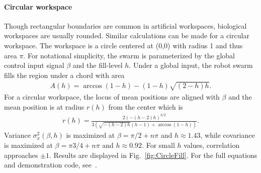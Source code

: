 \paragraph{Circular workspace}
Though rectangular boundaries are common in artificial workspaces, biological workspaces are usually rounded.
Similar calculations can be made for a circular workspace.  The workspace is a circle centered at (0,0) with radius 1 and thus area $\pi$.
For notational simplicity, the swarm is parameterized by the global control input signal $\beta$ and the fill-level $h$.  
Under a global input, the robot swarm fills the region under a chord with area
\begin{align}
A(h) = \arccos(1-h)-(1-h) \sqrt{(2-h) h}.
\end{align}
For a circular workspace, the locus of mean positions are aligned with $\beta$ and the mean position is at radius $r(h)$ from the center which is
\begin{align}
r(h) = \frac{2 (-(h-2) h)^{3/2}}{3 \left(\sqrt{-(h-2) h} (h-1)+\arccos(1-h)\right)}.
\end{align}
Variance $\sigma^2_x(\beta,h)$ is maximized at $\beta = \pi/2+n \pi$ and $h\approx1.43$, while covariance is maximized at $\beta = \pi3/4+n \pi$ and $h\approx0.92.$ For small $h$ values, correlation approaches $\pm1$. Results are displayed in Fig.~\ref{fig:CircleFill}.  For the full equations and demonstration code, see~\cite{Haoran2016SwarminCircle}.%

%


